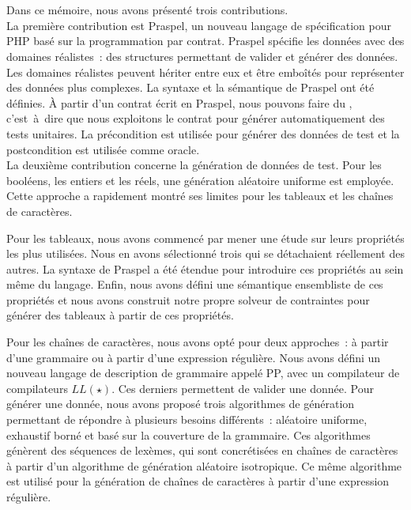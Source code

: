 \section{}
\label{section:conclusions:recapitulare}

Dans ce mémoire, nous avons présenté trois contributions. \\

La première contribution est Praspel, un nouveau langage de spécification pour
PHP basé sur la programmation par contrat. Praspel spécifie les données avec des
domaines réalistes~: des structures permettant de valider et générer des
données. Les domaines réalistes peuvent hériter entre eux et être emboîtés pour
représenter des données plus complexes. La syntaxe et la sémantique de Praspel
ont été définies. À partir d'un contrat écrit en Praspel, nous pouvons faire du
, c'est~à~dire que nous exploitons le contrat
pour générer automatiquement des tests unitaires. La précondition est utilisée
pour générer des données de test et la postcondition est utilisée comme oracle.
\\

La deuxième contribution concerne la génération de données de test. Pour les
booléens, les entiers et les réels, une génération aléatoire uniforme est
employée. Cette approche a rapidement montré ses limites pour les tableaux et
les chaînes de caractères.

Pour les tableaux, nous avons commencé par mener une étude sur leurs propriétés
les plus utilisées. Nous en avons sélectionné trois qui se détachaient
réellement des autres. La syntaxe de Praspel a été étendue pour introduire ces
propriétés au sein même du langage. Enfin, nous avons défini une sémantique
ensembliste de ces propriétés et nous avons construit notre propre solveur de
contraintes pour générer des tableaux à partir de ces propriétés.

Pour les chaînes de caractères, nous avons opté pour deux approches~: à partir
d'une grammaire ou à partir d'une expression régulière. Nous avons défini un
nouveau langage de description de grammaire appelé PP, avec un compilateur de
compilateurs $LL(\star)$. Ces derniers permettent de valider une donnée. Pour
générer une donnée, nous avons proposé trois algorithmes de génération
permettant de répondre à plusieurs besoins différents~: aléatoire uniforme,
exhaustif borné et basé sur la couverture de la grammaire. Ces algorithmes
génèrent des séquences de lexèmes, qui sont concrétisées en chaînes de
caractères à partir d'un algorithme de génération aléatoire isotropique. Ce même
algorithme est utilisé pour la génération de chaînes de caractères à partir
d'une expression régulière.

